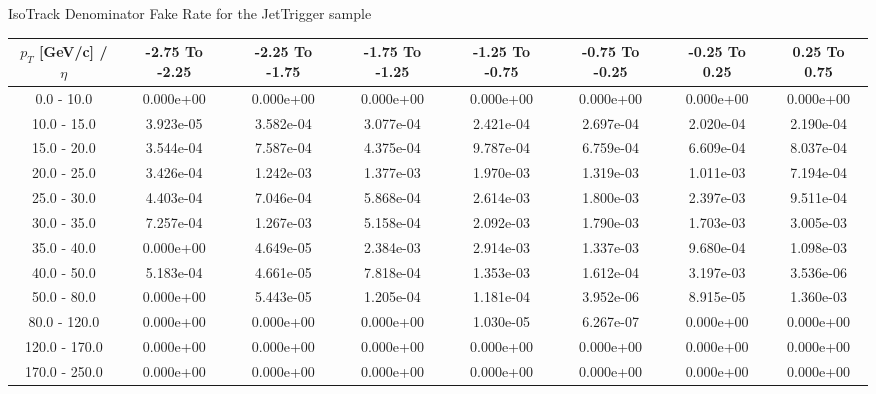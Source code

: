 \large 
IsoTrack Denominator Fake Rate for the JetTrigger sample
\footnotesize 
\begin{tabular*}{\textwidth}{|c|c|c|c|c|c|c|c|}\hline 
$p_T$ [GeV/c] / $\eta$  & -2.75 To -2.25 & -2.25 To -1.75 & -1.75 To -1.25 & -1.25 To -0.75 & -0.75 To -0.25 & -0.25 To 0.25 & 0.25 To 0.75 \\ 
 \hline 
0.0 - 10.0 & 0.000e+00 & 0.000e+00 & 0.000e+00 & 0.000e+00 & 0.000e+00 & 0.000e+00 & 0.000e+00 \\ 
10.0 - 15.0 & 3.923e-05 & 3.582e-04 & 3.077e-04 & 2.421e-04 & 2.697e-04 & 2.020e-04 & 2.190e-04 \\ 
15.0 - 20.0 & 3.544e-04 & 7.587e-04 & 4.375e-04 & 9.787e-04 & 6.759e-04 & 6.609e-04 & 8.037e-04 \\ 
20.0 - 25.0 & 3.426e-04 & 1.242e-03 & 1.377e-03 & 1.970e-03 & 1.319e-03 & 1.011e-03 & 7.194e-04 \\ 
25.0 - 30.0 & 4.403e-04 & 7.046e-04 & 5.868e-04 & 2.614e-03 & 1.800e-03 & 2.397e-03 & 9.511e-04 \\ 
30.0 - 35.0 & 7.257e-04 & 1.267e-03 & 5.158e-04 & 2.092e-03 & 1.790e-03 & 1.703e-03 & 3.005e-03 \\ 
35.0 - 40.0 & 0.000e+00 & 4.649e-05 & 2.384e-03 & 2.914e-03 & 1.337e-03 & 9.680e-04 & 1.098e-03 \\ 
40.0 - 50.0 & 5.183e-04 & 4.661e-05 & 7.818e-04 & 1.353e-03 & 1.612e-04 & 3.197e-03 & 3.536e-06 \\ 
50.0 - 80.0 & 0.000e+00 & 5.443e-05 & 1.205e-04 & 1.181e-04 & 3.952e-06 & 8.915e-05 & 1.360e-03 \\ 
80.0 - 120.0 & 0.000e+00 & 0.000e+00 & 0.000e+00 & 1.030e-05 & 6.267e-07 & 0.000e+00 & 0.000e+00 \\ 
120.0 - 170.0 & 0.000e+00 & 0.000e+00 & 0.000e+00 & 0.000e+00 & 0.000e+00 & 0.000e+00 & 0.000e+00 \\ 
170.0 - 250.0 & 0.000e+00 & 0.000e+00 & 0.000e+00 & 0.000e+00 & 0.000e+00 & 0.000e+00 & 0.000e+00 \\ 
 \hline 
\end{tabular*} 
